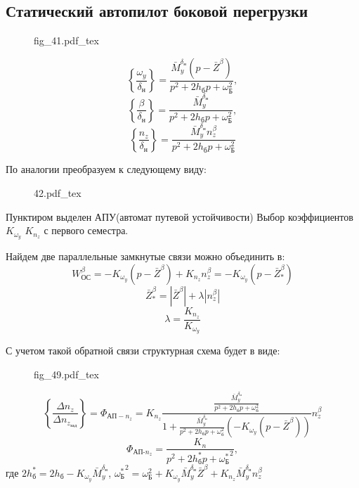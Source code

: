 \documentclass{article}
\newcommand{\incfig}[1]{
    {#1.pdf_tex}
}
\begin{document}
\subsection{Статический автопилот боковой перегрузки}

\begin{figure}[H]
    \centering
    {fig_41.pdf_tex}
\end{figure}

\[
    \left\{\frac{\omega_y}{\delta_\text{н}}\right\} =
    \frac{\bar{M}_y^{\delta_\text{н}}(p - \bar{Z}^\beta)}{ p^2 + 2 h_\text{б}p
    + \omega_\text{Б}^2 },
\]
\[
    \left\{ \frac{\beta}{\delta_\text{н}} \right\} = \frac{
    \bar{M}_y^{\delta_\text{н}} }{ p^2 + 2 h_\text{б}p + \omega_\text{Б}^2 }
    ,\]
\[
    \left\{ \frac{n_z}{\delta_\text{н}} \right\} = \frac{
    \bar{M}_y^{\delta_\text{н}} n_z^\beta }{ p^2 + 2 h_\text{б}p +
\omega_\text{Б}^2 }
\]

По аналогии преобразуем к следующему виду:

\begin{figure}[H]
    \centering
    {42.pdf_tex}
\end{figure}


Пунктиром выделен АПУ(автомат путевой устойчивости)
Выбор коэффициентов $K_{\omega_y}$ $K_{n_z}$ с первого семестра.

Найдем две параллельные замкнутые связи можно объединить в:
\[
    W_\text{ОС}^\beta = - K_{\omega_y} (p - \bar{Z}^\beta) + K_{n_z} n_z^\beta
    = - K_{\omega_y}(p - \bar{Z}_*^\beta)
\]
\[
    \bar{Z}_*^\beta = |\bar{Z}^\beta| + \lambda |n_z^\beta|
\]
\[
    \lambda = \frac{K_{n_z}}{K_{\omega_y}}
\]

С учетом такой обратной связи структурная схема будет в виде:

\begin{figure}[ht]
    \centering
    \incfig{fig_49}
    \label{fig:fig_49}
\end{figure}

\[
    \left\{\frac{\Delta n_z}{\Delta n_{z_\text{зад}}} \right\}  =
    \Phi_{\text{АП}-n_z} = K_{n_z}\frac{\frac{\bar{M}_y^{\delta_\text{н}}}{p^2
    + 2 h_\text{б} p + \omega_\text{б}^2}}{1
+\frac{\bar{M}_y^{\delta_\text{н}}}{p^2 + 2 h_\text{б} p + \omega_\text{б}^2}
(-K_{\omega_y}(p - \bar{Z}^\beta))}n_z^\beta
\]
\[
    \Phi_{\text{АП-}n_z} =\frac{K_n}{ p^2 + 2 h_\text{б}^*p +
    {\omega_\text{Б}^*}^2  },
\]
где $2h_\text{б}^* = 2h_\text{б} - K_{\omega_y}\bar{M}_y^{\delta_\text{н}}$,
${\omega_\text{Б}^*}^2 = \omega_\text{Б}^2 +
K_{\omega_y}\bar{M}_y^{\delta_\text{н}} \bar{Z}^\beta + K_{n_z}
\bar{M}_y^{\delta_\text{н}} n_z^\beta $
\end{document}

